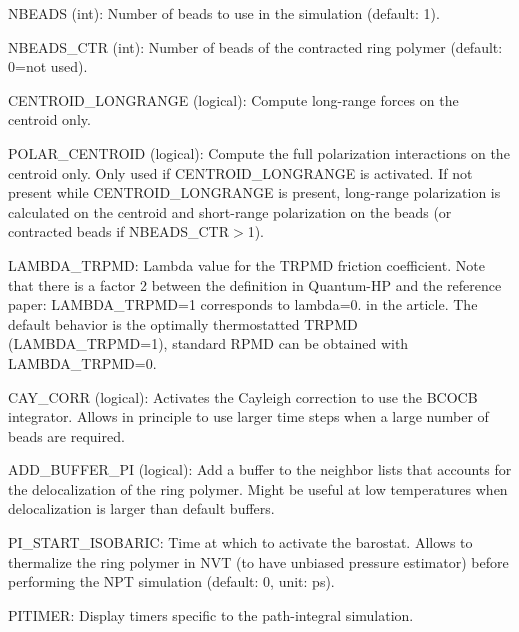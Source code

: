 \begin{DoxyItemize}
\item {\ttfamily N\-B\-E\-A\-D\-S} (int)\-: Number of beads to use in the simulation (default\-: 1).
\item {\ttfamily N\-B\-E\-A\-D\-S\-\_\-\-C\-T\-R} (int)\-: Number of beads of the contracted ring polymer (default\-: 0=not used).
\item {\ttfamily C\-E\-N\-T\-R\-O\-I\-D\-\_\-\-L\-O\-N\-G\-R\-A\-N\-G\-E} (logical)\-: Compute long-\/range forces on the centroid only.
\item {\ttfamily P\-O\-L\-A\-R\-\_\-\-C\-E\-N\-T\-R\-O\-I\-D} (logical)\-: Compute the full polarization interactions on the centroid only. Only used if {\ttfamily C\-E\-N\-T\-R\-O\-I\-D\-\_\-\-L\-O\-N\-G\-R\-A\-N\-G\-E} is activated. If not present while {\ttfamily C\-E\-N\-T\-R\-O\-I\-D\-\_\-\-L\-O\-N\-G\-R\-A\-N\-G\-E} is present, long-\/range polarization is calculated on the centroid and short-\/range polarization on the beads (or contracted beads if {\ttfamily N\-B\-E\-A\-D\-S\-\_\-\-C\-T\-R}$>$1).
\item {\ttfamily L\-A\-M\-B\-D\-A\-\_\-\-T\-R\-P\-M\-D}\-: Lambda value for the T\-R\-P\-M\-D friction coefficient. Note that there is a factor 2 between the definition in Quantum-\/\-H\-P and the reference paper\-: {\ttfamily L\-A\-M\-B\-D\-A\-\_\-\-T\-R\-P\-M\-D}=1 corresponds to lambda=0. in the article. The default behavior is the optimally thermostatted T\-R\-P\-M\-D ({\ttfamily L\-A\-M\-B\-D\-A\-\_\-\-T\-R\-P\-M\-D}=1), standard R\-P\-M\-D can be obtained with {\ttfamily L\-A\-M\-B\-D\-A\-\_\-\-T\-R\-P\-M\-D}=0.
\item {\ttfamily C\-A\-Y\-\_\-\-C\-O\-R\-R} (logical)\-: Activates the Cayleigh correction to use the B\-C\-O\-C\-B integrator. Allows in principle to use larger time steps when a large number of beads are required.
\item {\ttfamily A\-D\-D\-\_\-\-B\-U\-F\-F\-E\-R\-\_\-\-P\-I} (logical)\-: Add a buffer to the neighbor lists that accounts for the delocalization of the ring polymer. Might be useful at low temperatures when delocalization is larger than default buffers.
\item {\ttfamily P\-I\-\_\-\-S\-T\-A\-R\-T\-\_\-\-I\-S\-O\-B\-A\-R\-I\-C}\-: Time at which to activate the barostat. Allows to thermalize the ring polymer in N\-V\-T (to have unbiased pressure estimator) before performing the N\-P\-T simulation (default\-: 0, unit\-: ps).
\item {\ttfamily P\-I\-T\-I\-M\-E\-R}\-: Display timers specific to the path-\/integral simulation.

\end{DoxyItemize}
